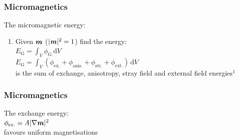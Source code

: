 \documentclass{beamer}
\begin{document}
        \begin{frame}
          \frametitle{Micromagnetics}
          \color{ImperialNavy}\huge{The micromagnetic energy:}
          \begin{enumerate}
                  \item Given $\textbf{\textit{m}}$ ($|\textbf{\textit{m}}|^\text{2}=\text{1}$) find the energy:\\
                  \vspace{2mm}
                  \large $\textit{E}_{\text{G}}=\int_{\textit{V}}\phi_{\text{G}}\,\text{d}\textit{V}$\\
                  \vspace{2mm}
                  $\textit{E}_{\text{G}}=\int_{\textit{V}}\left(\phi_{\text{ex.}}+\phi_{\text{anis.}}+\phi_{\text{str.}}+\phi_{\text{ext.}}\right)\,\text{d}\textit{V}$\\
                  \vspace{2mm}
                  is the sum of exchange, anisotropy, stray field and external field energies$^{\text{1}}$\\
                  \vspace{4mm}
          \end{enumerate}
        \end{frame}

        \begin{frame}
          \frametitle{Micromagnetics}
          \color{ImperialNavy}\huge{The exchange energy:}\\
          \center $\phi_{\text{ex.}}=\textit{A}|\nabla\textbf{\textit{m}}|^\text{2}$\\
          \flushleft \large \alert{favours uniform magnetisations}
        \end{frame}
\end{document}
